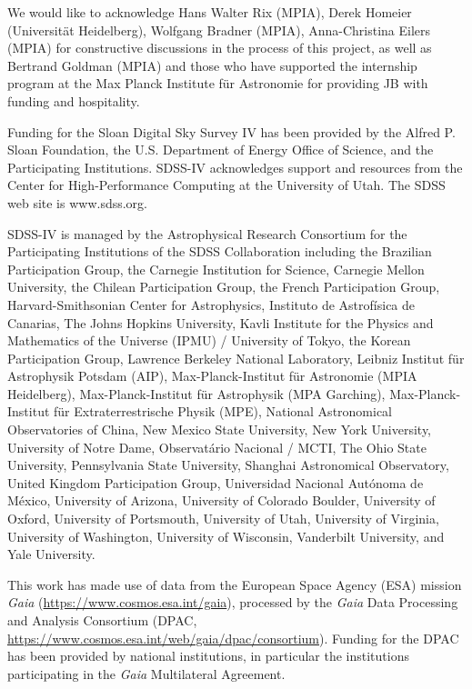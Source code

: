 \documentclass[modern]{aastex62}
\begin{document}
\acknowledgements
We would like to acknowledge Hans Walter Rix (MPIA), Derek Homeier (Universit{\"a}t Heidelberg), Wolfgang Bradner (MPIA), Anna-Christina Eilers (MPIA) for constructive discussions in the process of this project, as well as Bertrand Goldman (MPIA) and those who have supported the internship program at the Max Planck Institute f{\"u}r Astronomie for providing JB with funding and hospitality.

Funding for the Sloan Digital Sky Survey IV has been provided by the Alfred P. Sloan Foundation, the U.S. Department of Energy Office of Science, and the Participating Institutions. SDSS-IV acknowledges support and resources from the Center for High-Performance Computing at
the University of Utah. The SDSS web site is www.sdss.org.

SDSS-IV is managed by the Astrophysical Research Consortium for the 
Participating Institutions of the SDSS Collaboration including the 
Brazilian Participation Group, the Carnegie Institution for Science, 
Carnegie Mellon University, the Chilean Participation Group, the French Participation Group, Harvard-Smithsonian Center for Astrophysics, 
Instituto de Astrof\'isica de Canarias, The Johns Hopkins University, 
Kavli Institute for the Physics and Mathematics of the Universe (IPMU) / 
University of Tokyo, the Korean Participation Group, Lawrence Berkeley National Laboratory, 
Leibniz Institut f\"ur Astrophysik Potsdam (AIP),  
Max-Planck-Institut f\"ur Astronomie (MPIA Heidelberg), 
Max-Planck-Institut f\"ur Astrophysik (MPA Garching), 
Max-Planck-Institut f\"ur Extraterrestrische Physik (MPE), 
National Astronomical Observatories of China, New Mexico State University, 
New York University, University of Notre Dame, 
Observat\'ario Nacional / MCTI, The Ohio State University, 
Pennsylvania State University, Shanghai Astronomical Observatory, 
United Kingdom Participation Group,
Universidad Nacional Aut\'onoma de M\'exico, University of Arizona, 
University of Colorado Boulder, University of Oxford, University of Portsmouth, 
University of Utah, University of Virginia, University of Washington, University of Wisconsin, 
Vanderbilt University, and Yale University.

This work has made use of data from the European Space Agency (ESA) mission
{\it Gaia} (\url{https://www.cosmos.esa.int/gaia}), processed by the {\it Gaia}
Data Processing and Analysis Consortium (DPAC,
\url{https://www.cosmos.esa.int/web/gaia/dpac/consortium}). Funding for the DPAC
has been provided by national institutions, in particular the institutions
participating in the {\it Gaia} Multilateral Agreement.
\end{document}
